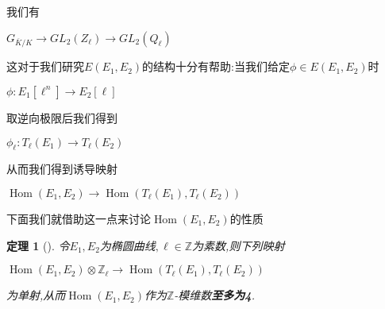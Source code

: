 \documentclass[11pt]{ctexart}
\DeclareMathOperator{\Hom}{Hom}
\newtheorem{thm}{定理}[section]
\begin{document}
 \noindent 我们有
 \begin{center}
    $G_{\overline{K}/K}\longrightarrow GL_2(Z_{\ell})\longrightarrow GL_2(Q_{\ell})$
 \end{center}
这对于我们研究$E(E_1,E_2)$的结构十分有帮助:当我们给定$\phi \in E(E_1,E_2)$时
\begin{center}
    $\phi : E_1[\ell^n] \longrightarrow E_2[\ell]$
\end{center}
\noindent 取逆向极限后我们得到
\begin{center}
    $\phi_{\ell}:T_{\ell}(E_1)\longrightarrow T_{\ell}(E_2)$
\end{center}
\noindent 从而我们得到诱导映射
\begin{center}
    $\Hom(E_1,E_2)\longrightarrow \Hom(T_{\ell}(E_1),T_{\ell}(E_2))$
\end{center}
\noindent 下面我们就借助这一点来讨论$\Hom(E_1,E_2)$的性质
\begin{thm}[]\label{stu}
    令$E_1,E_2$为椭圆曲线$,\ell \in \mathbb{Z}$为素数,则下列映射
    \begin{center}
        $\Hom(E_1,E_2)\otimes \mathbb{Z}_{\ell} \longrightarrow \Hom(T_{\ell}(E_1),T_{\ell}(E_2)) $
    \end{center}
    \noindent 为单射,从而$\Hom(E_1,E_2)$作为$\mathbb{Z}$-模维数\textbf{至多为4}.


\end{thm}
\end{document}
